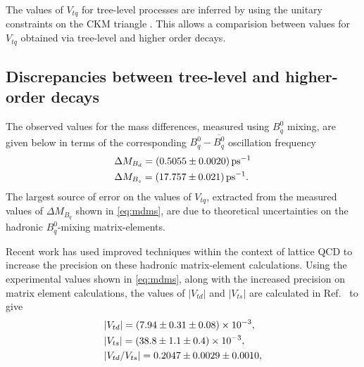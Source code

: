 The values of $V_{tq}$ for tree-level processes are inferred by using the unitary constraints
on the CKM triangle \cite{ckm}. This allows a comparision between values for $V_{tq}$ obtained via tree-level and higher order decays.%
\subsection{Discrepancies between tree-level and higher-order decays}
\label{subsubsec:loop}
The observed values for the mass differences, measured using $B^{0}_{q}$ mixing, are given below in terms of the corresponding $B^{0}_{q} - \overline{B^{0}_{q}}$ oscillation frequency\cite{pdg} \cite{LHCb-PAPER-2013-006}
\begin{equation}
  \begin{split}
    &
  \Delta M_{B_{d}} = (0.5055\pm0.0020){\rm \,ps}^{-1} \\&
  \Delta M_{{B}_{s}} = (17.757 \pm 0.021){\rm \,ps}^{-1}.\\
  \end{split}
\label{eq:mdms}
\end{equation}
The largest source of error on the values of $V_{tq}$, extracted from the measured values of $\Delta M_{B_{q}}$ shown in \autoref{eq:mdms}, are due to theoretical uncertainties on the hadronic $B^{0}_{q}$-mixing matrix-elements.

Recent work \cite{vtdvts} has used improved
techniques within the context of lattice QCD to increase the
precision on these hadronic matrix-element calculations. Using the
experimental values shown in \autoref{eq:mdms}, along with the
increased precision on matrix element calculations, the values of
$|V_{td}|$ and $|V_{ts}|$ are calculated in Ref.~\cite{vtdvts} to give
\begin{equation}
  \begin{split}
 & |{V_{{t}{d}}}| = (7.94 \pm 0.31 \pm 0.08)\times 10^{-3},\\
& |{V_{{t}{s}}}| = (38.8\pm 1.1 \pm 0.4)\times 10^{-3},\\
& |{V_{{t}{d}}}/{V_{{t}{s}}}| = 0.2047\pm 0.0029 \pm 0.0010,
  \end{split}
\end{equation}

